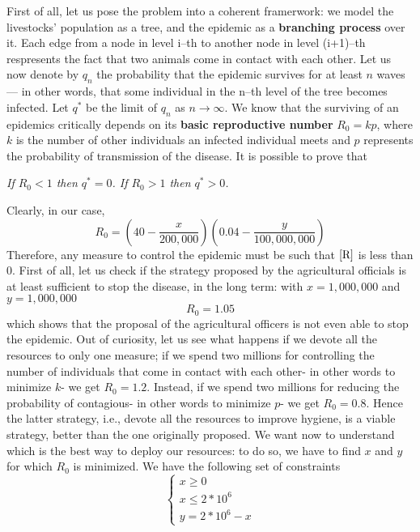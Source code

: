 \documentclass{report}
\theoremstyle{definition}
\theoremstyle{remark}
\begin{document}
First of all, let us pose the problem into a coherent framerwork: we model the livestocks' population as a tree, and the epidemic as a \textbf{branching process} over it. Each edge from a node in level i--th to another node in level (i+1)--th respresents the fact that two animals come in contact with each other. Let us now denote by $q_n$ the probability that the epidemic survives for at least $n$ waves — in other words, that some individual in the n--th level of the tree becomes infected. Let $q^*$ be the limit of $q_n$ as $n \rightarrow \infty$. We know that the surviving of an epidemics critically depends on its \textbf{basic reproductive number} $R_0 = kp$, where $k$ is the number of other individuals an infected individual meets and $p$ represents the probability of transmission of the disease. It is possible to prove that 
\bigskip 

\textit{If $R_0<1$ then $q^* = 0$. If $R_0>1$ then $q^*>0$.}
\bigskip

Clearly, in our case,
\begin{equation} \label{R}
R_0 = \left(40-\frac{x}{200,000}\right)\left(0.04-\frac{y}{100,000,000}\right)
\end{equation}
Therefore, any measure to control the epidemic must be such that $\eqref{R}$ is less than $0$. First of all, let us check if the strategy proposed by the agricultural officials is at least sufficient to stop the disease, in the long term: with $x = 1,000,000$ and $y = 1,000,000$
\begin{equation*}
R_0 = 1.05
\end{equation*}
which shows that the proposal of the agricultural officers is not even able to stop the epidemic. Out of curiosity, let us see what happens if we devote all the resources to only one measure; if we spend two millions for controlling the number of individuals that come in contact with each other- in other words to minimize $k$- we get $R_0 = 1.2$. Instead, if we spend two millions for reducing the probability of contagious- in other words to minimize $p$- we get $R_0 = 0.8$. Hence the latter strategy, i.e., devote all the resources to improve hygiene, is a viable strategy, better than the one originally proposed. 
We want now to understand which is the best way to deploy our resources: to do so, we have to find $x$ and $y$ for which $R_0$ is minimized. We have the following set of constraints
\begin{equation*}
\begin{cases}
x\geq 0
\\ x \leq 2*10^6
\\ y = 2*10^6-x
\end{cases}
\end{equation*}
\end{document}
